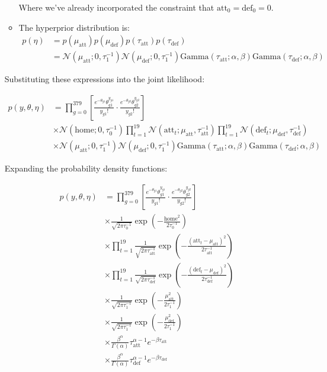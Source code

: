\documentclass{article}
\begin{document}
\begin{enumerate}
\begin{itemize}
    Where we've already incorporated the constraint that $\text{att}_0 = \text{def}_0 = 0$.
    
    \item The hyperprior distribution is:
    \begin{align}
    p(\eta) &= p(\mu_{\text{att}})p(\mu_{\text{def}})p(\tau_{\text{att}})p(\tau_{\text{def}}) \\
    &= \mathcal{N}(\mu_{\text{att}}; 0, \tau_1^{-1}) \mathcal{N}(\mu_{\text{def}}; 0, \tau_1^{-1}) \text{Gamma}(\tau_{\text{att}}; \alpha, \beta) \text{Gamma}(\tau_{\text{def}}; \alpha, \beta)
    \end{align}
    \end{itemize}
    
    Substituting these expressions into the joint likelihood:
    
    \begin{align}
    p(y, \theta, \eta) &= \prod_{g=0}^{379} \left[\frac{e^{-\theta_{g1}}\theta_{g1}^{y_{g1}}}{y_{g1}!} \cdot \frac{e^{-\theta_{g2}}\theta_{g2}^{y_{g2}}}{y_{g2}!}\right] \\
    &\times \mathcal{N}(\text{home}; 0, \tau_0^{-1}) \prod_{t=1}^{19} \mathcal{N}(\text{att}_t; \mu_{\text{att}}, \tau_{\text{att}}^{-1}) \prod_{t=1}^{19} \mathcal{N}(\text{def}_t; \mu_{\text{def}}, \tau_{\text{def}}^{-1}) \\
    &\times \mathcal{N}(\mu_{\text{att}}; 0, \tau_1^{-1}) \mathcal{N}(\mu_{\text{def}}; 0, \tau_1^{-1}) \text{Gamma}(\tau_{\text{att}}; \alpha, \beta) \text{Gamma}(\tau_{\text{def}}; \alpha, \beta)
    \end{align}
    
    Expanding the probability density functions:
    
    \begin{align}
    p(y, \theta, \eta) &= \prod_{g=0}^{379} \left[\frac{e^{-\theta_{g1}}\theta_{g1}^{y_{g1}}}{y_{g1}!} \cdot \frac{e^{-\theta_{g2}}\theta_{g2}^{y_{g2}}}{y_{g2}!}\right] \\
    &\times \frac{1}{\sqrt{2\pi\tau_0^{-1}}}\exp\left(-\frac{\text{home}^2}{2\tau_0^{-1}}\right) \\
    &\times \prod_{t=1}^{19} \frac{1}{\sqrt{2\pi\tau_{\text{att}}^{-1}}}\exp\left(-\frac{(\text{att}_t-\mu_{\text{att}})^2}{2\tau_{\text{att}}^{-1}}\right) \\
    &\times \prod_{t=1}^{19} \frac{1}{\sqrt{2\pi\tau_{\text{def}}^{-1}}}\exp\left(-\frac{(\text{def}_t-\mu_{\text{def}})^2}{2\tau_{\text{def}}^{-1}}\right) \\
    &\times \frac{1}{\sqrt{2\pi\tau_1^{-1}}}\exp\left(-\frac{\mu_{\text{att}}^2}{2\tau_1^{-1}}\right) \\
    &\times \frac{1}{\sqrt{2\pi\tau_1^{-1}}}\exp\left(-\frac{\mu_{\text{def}}^2}{2\tau_1^{-1}}\right) \\
    &\times \frac{\beta^\alpha}{\Gamma(\alpha)}\tau_{\text{att}}^{\alpha-1}e^{-\beta\tau_{\text{att}}} \\
    &\times \frac{\beta^\alpha}{\Gamma(\alpha)}\tau_{\text{def}}^{\alpha-1}e^{-\beta\tau_{\text{def}}}
    \end{align}
    

\end{enumerate}
\end{document}
